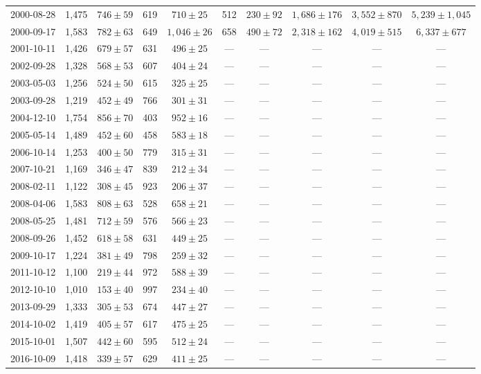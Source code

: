 \begin{landscape}
\begin{longtable}{cccccccccc}
{2000-08-28} & 1,475 & {$746  \pm  59$} & 619 & {$710 \pm 25$} & 512 & {$230 \pm 92$} & {$1,686 \pm 176$} & {$3,552 \pm 870$} & {$5,239 \pm 1,045$} \\
{2000-09-17} & 1,583 & {$782  \pm  63$} & 649 & {$1,046 \pm 26$} & 658 & {$490 \pm 72$} & {$2,318 \pm 162$} & {$4,019 \pm 515$} & {$6,337 \pm 677$} \\
{2001-10-11} & 1,426 & {$679  \pm  57$} & 631 & {$496 \pm 25$} & --- & --- & --- & --- & --- \\
{2002-09-28} & 1,328 & {$568  \pm  53$} & 607 & {$404 \pm 24$} & --- & --- & --- & --- & --- \\
{2003-05-03} & 1,256 & {$524  \pm  50$} & 615 & {$325 \pm 25$} & --- & --- & --- & --- & --- \\
{2003-09-28} & 1,219 & {$452  \pm  49$} & 766 & {$301 \pm 31$} & --- & --- & --- & --- & --- \\
{2004-12-10} & 1,754 & {$856  \pm  70$} & 403 & {$952 \pm 16$} & --- & --- & --- & --- & --- \\
{2005-05-14} & 1,489 & {$452  \pm  60$} & 458 & {$583 \pm 18$} & --- & --- & --- & --- & --- \\
{2006-10-14} & 1,253 & {$400  \pm  50$} & 779 & {$315 \pm 31$} & --- & --- & --- & --- & --- \\
{2007-10-21} & 1,169 & {$346  \pm  47$} & 839 & {$212 \pm 34$} & --- & --- & --- & --- & --- \\
{2008-02-11} & 1,122 & {$308  \pm  45$} & 923 & {$206 \pm 37$} & --- & --- & --- & --- & --- \\
{2008-04-06} & 1,583 & {$808  \pm  63$} & 528 & {$658 \pm 21$} & --- & --- & --- & --- & --- \\
{2008-05-25} & 1,481 & {$712  \pm  59$} & 576 & {$566 \pm 23$} & --- & --- & --- & --- & --- \\
{2008-09-26} & 1,452 & {$618  \pm  58$} & 631 & {$449 \pm 25$} & --- & --- & --- & --- & --- \\
{2009-10-17} & 1,224 & {$381  \pm  49$} & 798 & {$259 \pm 32$} & --- & --- & --- & --- & --- \\
{2011-10-12} & 1,100 & {$219  \pm  44$} & 972 & {$588 \pm 39$} & --- & --- & --- & --- & --- \\
{2012-10-10} & 1,010 & {$153  \pm  40$} & 997 & {$234 \pm 40$} & --- & --- & --- & --- & --- \\
{2013-09-29} & 1,333 & {$305  \pm  53$} & 674 & {$447 \pm 27$} & --- & --- & --- & --- & --- \\
{2014-10-02} & 1,419 & {$405  \pm  57$} & 617 & {$475 \pm 25$} & --- & --- & --- & --- & --- \\
{2015-10-01} & 1,507 & {$442  \pm  60$} & 595 & {$512 \pm 24$} & --- & --- & --- & --- & --- \\
{2016-10-09} & 1,418 & {$339  \pm  57$} & 629 & {$411 \pm 25$} & --- & --- & --- & --- & --- \\
\end{longtable} 
\end{landscape} 
